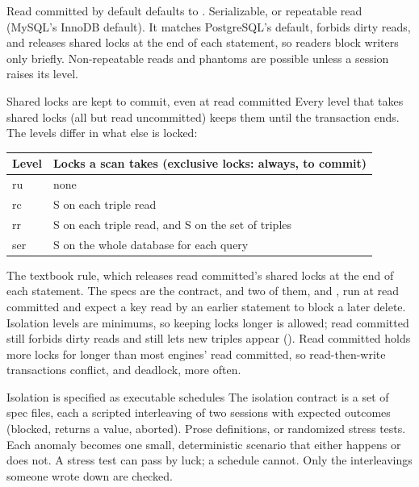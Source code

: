 \begin{decision}{Read committed by default}
  defaults to .
 Serializable, or repeatable read (MySQL's InnoDB default).
 It matches PostgreSQL's default, forbids dirty reads, and releases
shared locks at the end of each statement, so readers block writers only
briefly.
 Non-repeatable reads and phantoms are possible unless a session
raises its level.
\end{decision}

\begin{decision}{Shared locks are kept to commit, even at read committed}
 Every level that takes shared locks (all but read uncommitted)
keeps them until the transaction ends. The levels differ in what else is
locked:

\smallskip
\begin{tabular}{@{}ll@{}}
\toprule
Level & Locks a scan takes (exclusive locks: always, to commit) \\
\midrule
ru & none \\
rc & S on each triple read \\
rr & S on each triple read, and S on the set of triples \\
ser & S on the whole database for each query \\
\bottomrule
\end{tabular}
\smallskip

 The textbook rule, which releases read committed's shared
locks at the end of each statement.
 The specs are the contract, and two of them, 
and , run at read committed and expect a key read by an
earlier statement to block a later delete. Isolation levels are minimums, so
keeping locks longer is allowed; read committed still forbids dirty reads and
still lets new triples appear ().
 Read committed holds more locks for longer than most engines'
read committed, so read-then-write transactions conflict, and deadlock, more
often.
\end{decision}

\begin{decision}{Isolation is specified as executable schedules}
 The isolation contract is a set of spec files, each a scripted
interleaving of two sessions with expected outcomes (blocked, returns a value,
aborted).
 Prose definitions, or randomized stress tests.
 Each anomaly becomes one small, deterministic scenario that either
happens or does not. A stress test can pass by luck; a schedule cannot.
 Only the interleavings someone wrote down are checked.
\end{decision}

